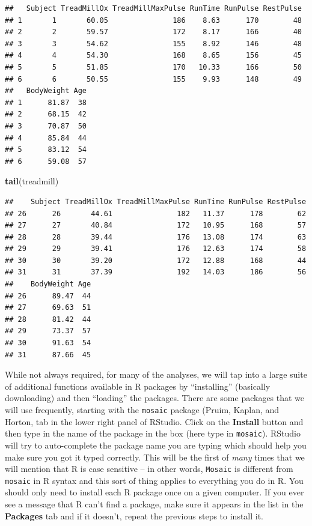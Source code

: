 \documentclass[]{book}
\newenvironment{Shaded}{\begin{snugshade}}{\end{snugshade}}
\newcommand{\KeywordTok}[1]{\textcolor[rgb]{0.13,0.29,0.53}{\textbf{{#1}}}}
\newcommand{\NormalTok}[1]{{#1}}
\begin{document}
\begin{verbatim}
##   Subject TreadMillOx TreadMillMaxPulse RunTime RunPulse RestPulse
## 1       1       60.05               186    8.63      170        48
## 2       2       59.57               172    8.17      166        40
## 3       3       54.62               155    8.92      146        48
## 4       4       54.30               168    8.65      156        45
## 5       5       51.85               170   10.33      166        50
## 6       6       50.55               155    9.93      148        49
##   BodyWeight Age
## 1      81.87  38
## 2      68.15  42
## 3      70.87  50
## 4      85.84  44
## 5      83.12  54
## 6      59.08  57
\end{verbatim}

\begin{Shaded}
\begin{Highlighting}[]
\KeywordTok{tail}\NormalTok{(treadmill)}
\end{Highlighting}
\end{Shaded}

\begin{verbatim}
##    Subject TreadMillOx TreadMillMaxPulse RunTime RunPulse RestPulse
## 26      26       44.61               182   11.37      178        62
## 27      27       40.84               172   10.95      168        57
## 28      28       39.44               176   13.08      174        63
## 29      29       39.41               176   12.63      174        58
## 30      30       39.20               172   12.88      168        44
## 31      31       37.39               192   14.03      186        56
##    BodyWeight Age
## 26      89.47  44
## 27      69.63  51
## 28      81.42  44
## 29      73.37  57
## 30      91.63  54
## 31      87.66  45
\end{verbatim}

While not always required, for many of the analyses, we will tap into a
large suite of additional functions available in R packages by
``installing'' (basically downloading) and then ``loading'' the
packages. There are some packages that we will use frequently, starting
with the \texttt{mosaic} package (Pruim, Kaplan, and Horton, tab in the
lower right panel of RStudio. Click on the \textbf{Install} button and
then type in the name of the package in the box (here type in
\texttt{mosaic}). RStudio will try to auto-complete the package name you
are typing which should help you make sure you got it typed correctly.
This will be the first of \emph{many} times that we will mention that R
is case sensitive -- in other words, \texttt{Mosaic} is different from
\texttt{mosaic} in R syntax and this sort of thing applies to everything
you do in R. You should only need to install each R package once on a
given computer. If you ever see a message that R can't find a package,
make sure it appears in the list in the \textbf{Packages} tab and if it
doesn't, repeat the previous steps to install it.
\end{document}
